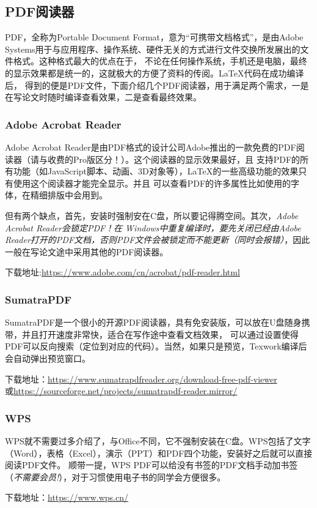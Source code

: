 \subsection{PDF阅读器}


PDF，全称为Portable Document Format，意为“可携带文档格式”，是由Adobe Systems用于与应用程序、操作系统、硬件无关的方式进行文件交换所发展出的文件格式。这种格式最大的优点在于，
不论在任何操作系统，手机还是电脑，最终的显示效果都是统一的，这就极大的方便了资料的传阅。\LaTeX{}代码在成功编译后，
得到的便是PDF文件，下面介绍几个PDF阅读器，用于满足两个需求，一是在写论文时随时编译查看效果，二是查看最终效果。



\subsubsection{Adobe Acrobat Reader}


Adobe Acrobat Reader是由PDF格式的设计公司Adobe推出的一款免费的PDF阅读器（请与收费的Pro版区分！）。这个阅读器的显示效果最好，且
支持PDF的所有功能（如JavaScript脚本、动画、3D对象等），\LaTeX{}的一些高级功能的效果只有使用这个阅读器才能完全显示。并且
可以查看PDF的许多属性比如使用的字体，在精细排版中会用到。

但有两个缺点，首先，安装时强制安在C盘，所以要记得腾空间。其次，\emph{Adobe Acrobat Reader会锁定PDF！在
Windows中重复编译时，要先关闭已经由Adobe Reader打开的PDF文档，否则PDF文件会被锁定而不能更新（同时会报错）}，因此
一般在写论文途中采用其他的PDF阅读器。

下载地址:\url{https://www.adobe.com/cn/acrobat/pdf-reader.html}
\subsubsection{SumatraPDF}
SumatraPDF是一个很小的开源PDF阅读器，具有免安装版，可以放在U盘随身携带，并且打开速度非常快，适合在写作途中查看文档效果，
可以通过设置使得PDF可以反向搜索（定位到对应的代码）。当然，如果只是预览，Texwork编译后会自动弹出预览窗口。

下载地址：\url{https://www.sumatrapdfreader.org/download-free-pdf-viewer}\\或\url{https://sourceforge.net/projects/sumatrapdf-reader.mirror/}



\subsubsection{WPS}


WPS就不需要过多介绍了，与Office不同，它不强制安装在C盘。WPS包括了文字（Word），表格（Excel），演示（PPT）和PDF四个功能，安装好之后就可以直接阅读PDF文件。
顺带一提，WPS PDF可以给没有书签的PDF文档手动加书签（\emph{不需要会员!}），对于习惯使用电子书的同学会方便很多。

下载地址：\url{https://www.wps.cn/}
